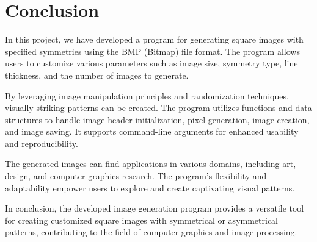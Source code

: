 \documentclass{report}
\begin{document}
\section {Conclusion}

In this project, we have developed a program for generating square images with specified symmetries using the BMP (Bitmap) file format. The program allows users to customize various parameters such as image size, symmetry type, line thickness, and the number of images to generate.

By leveraging image manipulation principles and randomization techniques, visually striking patterns can be created. The program utilizes functions and data structures to handle image header initialization, pixel generation, image creation, and image saving. It supports command-line arguments for enhanced usability and reproducibility.

The generated images can find applications in various domains, including art, design, and computer graphics research. The program's flexibility and adaptability empower users to explore and create captivating visual patterns.

In conclusion, the developed image generation program provides a versatile tool for creating customized square images with symmetrical or asymmetrical patterns, contributing to the field of computer graphics and image processing.


\end{document}
